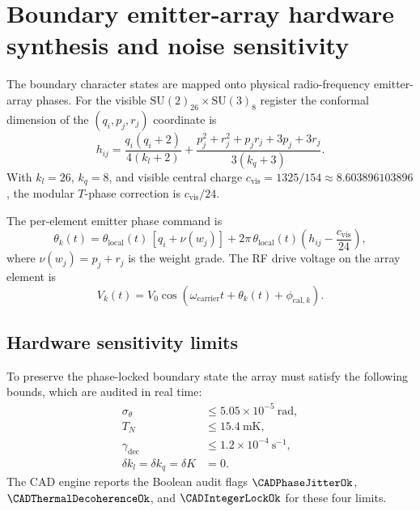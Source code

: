 \section{Boundary emitter-array hardware synthesis and noise sensitivity}\label{sec:emitter-array}

The boundary character states are mapped onto physical radio-frequency
emitter-array phases.  For the visible $\mathrm{SU}(2)_{26}\times\mathrm{SU}(3)_8$
register the conformal dimension of the $(q_i,p_j,r_j)$ coordinate is
\begin{equation}
  h_{ij}
  =
  \frac{q_i(q_i+2)}{4(k_l+2)}
  +
  \frac{p_j^2+r_j^2+p_j r_j+3p_j+3r_j}{3(k_q+3)}.
  \label{eq:visible-conformal-dimension}
\end{equation}
With $k_l=26$, $k_q=8$, and visible central charge
$c_{\mathrm{vis}}=1325/154\approx 8.603896103896$, the modular
$T$-phase correction is $c_{\mathrm{vis}}/24$.

The per-element emitter phase command is
\begin{equation}
  \theta_k(t)
  =
  \theta_{\mathrm{local}}(t)\,[q_i+\nu(w_j)]
  +
  2\pi\,\theta_{\mathrm{local}}(t)
  \left(h_{ij}-\frac{c_{\mathrm{vis}}}{24}\right),
  \label{eq:emitter-phase-command}
\end{equation}
where $\nu(w_j)=p_j+r_j$ is the weight grade.  The RF drive voltage on the
array element is
\begin{equation}
  V_k(t)
  =
  V_0\cos\!\left(\omega_{\mathrm{carrier}}t+\theta_k(t)+\phi_{\mathrm{cal},k}\right).
  \label{eq:rf-drive-signal}
\end{equation}

\subsection{Hardware sensitivity limits}

To preserve the phase-locked boundary state the array must satisfy the
following bounds, which are audited in real time:
\begin{align}
  \sigma_\theta &\le 5.05\times10^{-5}\ \mathrm{rad},
  \label{eq:phase-jitter-limit}\\
  T_N &\le 15.4\ \mathrm{mK},
  \label{eq:thermal-noise-limit}\\
  \gamma_{\mathrm{dec}} &\le 1.2\times10^{-4}\ \mathrm{s^{-1}},
  \label{eq:decoherence-rate-limit}\\
  \delta k_l=\delta k_q=\delta K&=0.
  \label{eq:integer-level-lock}
\end{align}
The CAD engine reports the Boolean audit flags
$\CADPhaseJitterOk$, $\CADThermalDecoherenceOk$, and
$\CADIntegerLockOk$ for these four limits.
